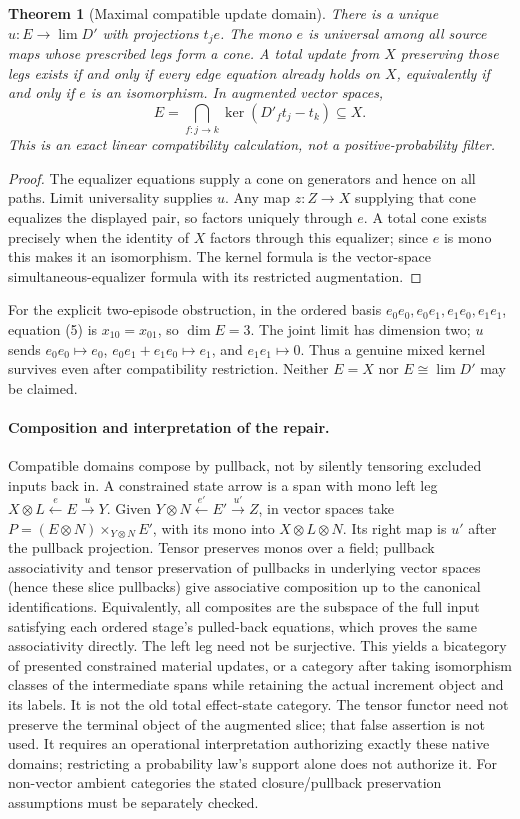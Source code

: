 \documentclass[11pt]{article}
\newtheorem{theorem}{Theorem}\newtheorem{proposition}{Proposition}\newtheorem{lemma}{Lemma}
\begin{document}
\begin{theorem}[Maximal compatible update domain]
There is a unique $u:E\to\lim D'$ with projections $t_j e$. The mono $e$ is universal among all source maps whose prescribed legs form a cone. A total update from $X$ preserving those legs exists if and only if every edge equation already holds on $X$, equivalently if and only if $e$ is an isomorphism. In augmented vector spaces,
\[
 E=\bigcap_{f:j\to k}\ker(D'_f t_j-t_k)\subseteq X.\tag{5}
\]
This is an exact linear compatibility calculation, not a positive-probability filter.
\end{theorem}
\begin{proof}
The equalizer equations supply a cone on generators and hence on all paths. Limit universality supplies $u$. Any map $z:Z\to X$ supplying that cone equalizes the displayed pair, so factors uniquely through $e$. A total cone exists precisely when the identity of $X$ factors through this equalizer; since $e$ is mono this makes it an isomorphism. The kernel formula is the vector-space simultaneous-equalizer formula with its restricted augmentation.
\end{proof}

For the explicit two-episode obstruction, in the ordered basis $e_0e_0,e_0e_1,e_1e_0,e_1e_1$, equation (5) is $x_{10}=x_{01}$, so $\dim E=3$. The joint limit has dimension two; $u$ sends $e_0e_0\mapsto e_0$, $e_0e_1+e_1e_0\mapsto e_1$, and $e_1e_1\mapsto0$. Thus a genuine mixed kernel survives even after compatibility restriction. Neither $E=X$ nor $E\cong\lim D'$ may be claimed.

\paragraph{Composition and interpretation of the repair.}
Compatible domains compose by pullback, not by silently tensoring excluded inputs back in. A constrained state arrow is a span with mono left leg $X\otimes L\xleftarrow{e}E\xrightarrow{u}Y$. Given $Y\otimes N\xleftarrow{e'}E'\xrightarrow{u'}Z$, in vector spaces take $P=(E\otimes N)\times_{Y\otimes N}E'$, with its mono into $X\otimes L\otimes N$. Its right map is $u'$ after the pullback projection. Tensor preserves monos over a field; pullback associativity and tensor preservation of pullbacks in underlying vector spaces (hence these slice pullbacks) give associative composition up to the canonical identifications. Equivalently, all composites are the subspace of the full input satisfying each ordered stage's pulled-back equations, which proves the same associativity directly. The left leg need not be surjective. This yields a bicategory of presented constrained material updates, or a category after taking isomorphism classes of the intermediate spans while retaining the actual increment object and its labels. It is not the old total effect-state category. The tensor functor need not preserve the terminal object of the augmented slice; that false assertion is not used. It requires an operational interpretation authorizing exactly these native domains; restricting a probability law's support alone does not authorize it. For non-vector ambient categories the stated closure/pullback preservation assumptions must be separately checked.
\end{document}
